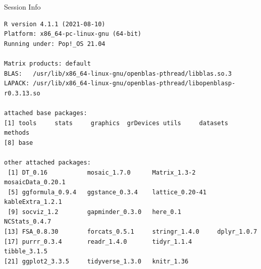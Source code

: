 \documentclass[10pt,handout]{beamer}\usepackage[]{graphicx}\usepackage[]{color}
\makeatletter
\newenvironment{kframe}{%
 \def\at@end@of@kframe{}%
 \ifinner\ifhmode%
  \def\at@end@of@kframe{\end{minipage}}%
  \begin{minipage}{\columnwidth}%
 \fi\fi%
 \def\FrameCommand##1{\hskip\@totalleftmargin \hskip-\fboxsep
 \colorbox{shadecolor}{##1}\hskip-\fboxsep
     \hskip-\linewidth \hskip-\@totalleftmargin \hskip\columnwidth}%
 \MakeFramed {\advance\hsize-\width
   \@totalleftmargin\z@ \linewidth\hsize
   \@setminipage}}%
 {\par\unskip\endMakeFramed%
 \at@end@of@kframe}
\newenvironment{knitrout}{}{} %
\makeatother
\begin{document}


\begin{frame}[fragile]{Session Info}
	\tiny
	
\begin{knitrout}\tiny
{}\color{fgcolor}\begin{kframe}
\begin{verbatim}
R version 4.1.1 (2021-08-10)
Platform: x86_64-pc-linux-gnu (64-bit)
Running under: Pop!_OS 21.04

Matrix products: default
BLAS:   /usr/lib/x86_64-linux-gnu/openblas-pthread/libblas.so.3
LAPACK: /usr/lib/x86_64-linux-gnu/openblas-pthread/libopenblasp-r0.3.13.so

attached base packages:
[1] tools     stats     graphics  grDevices utils     datasets  methods  
[8] base     

other attached packages:
 [1] DT_0.16           mosaic_1.7.0      Matrix_1.3-2      mosaicData_0.20.1
 [5] ggformula_0.9.4   ggstance_0.3.4    lattice_0.20-41   kableExtra_1.2.1 
 [9] socviz_1.2        gapminder_0.3.0   here_0.1          NCStats_0.4.7    
[13] FSA_0.8.30        forcats_0.5.1     stringr_1.4.0     dplyr_1.0.7      
[17] purrr_0.3.4       readr_1.4.0       tidyr_1.1.4       tibble_3.1.5     
[21] ggplot2_3.3.5     tidyverse_1.3.0   knitr_1.36       


\end{verbatim}
\end{kframe}
\end{knitrout}
\end{frame}
\end{document}
